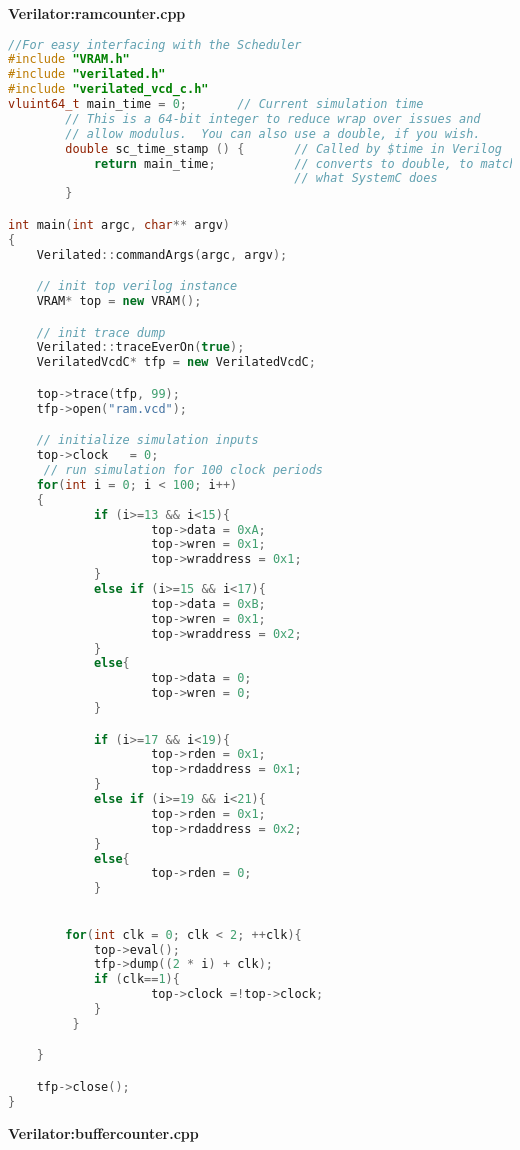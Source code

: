 \documentclass[twoside,12pt,fleqn]{book} %
\begin{document}
\newpage
\textbf{Verilator:ramcounter.cpp}
\begin{lstlisting}[language=C++]
//For easy interfacing with the Scheduler
#include "VRAM.h" 
#include "verilated.h" 
#include "verilated_vcd_c.h" 
vluint64_t main_time = 0;       // Current simulation time
        // This is a 64-bit integer to reduce wrap over issues and
        // allow modulus.  You can also use a double, if you wish.
        double sc_time_stamp () {       // Called by $time in Verilog
            return main_time;           // converts to double, to match
                                        // what SystemC does
        }

int main(int argc, char** argv)
{
    Verilated::commandArgs(argc, argv);

    // init top verilog instance
    VRAM* top = new VRAM();

    // init trace dump
    Verilated::traceEverOn(true);
    VerilatedVcdC* tfp = new VerilatedVcdC;

    top->trace(tfp, 99);
    tfp->open("ram.vcd");

    // initialize simulation inputs
    top->clock   = 0;
     // run simulation for 100 clock periods
    for(int i = 0; i < 100; i++)
    {   
            if (i>=13 && i<15){
                    top->data = 0xA;
                    top->wren = 0x1;
                    top->wraddress = 0x1;
            }
            else if (i>=15 && i<17){
                    top->data = 0xB;
                    top->wren = 0x1;
                    top->wraddress = 0x2;
            }
            else{
                    top->data = 0;
                    top->wren = 0;
            }

            if (i>=17 && i<19){
                    top->rden = 0x1;
                    top->rdaddress = 0x1;
            }
            else if (i>=19 && i<21){
                    top->rden = 0x1;
                    top->rdaddress = 0x2;
            }
            else{
                    top->rden = 0;
            }

        
        for(int clk = 0; clk < 2; ++clk){
            top->eval();
            tfp->dump((2 * i) + clk);
            if (clk==1){
                    top->clock =!top->clock;
            }
         }

    }

    tfp->close();
}
\end{lstlisting}
\newpage
\textbf{Verilator:buffercounter.cpp}
\end{document}
